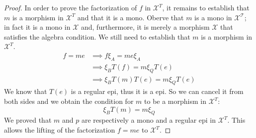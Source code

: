 \begin{subbox}{}
\begin{proof}
        In order to prove the factorization of $f$ in $\mathcal{X}^T$, it remains to establish that $m$ is a morphism in $\mathcal{X}^T$ and that it is a mono. Oberve that $m$ is a mono in $\mathcal{X^T}$; in fact it is a mono in $\mathcal{X}$ and, furthermore, it is merely a morphism $\mathcal{X}$ that satisfies the algebra condition. We still need to establish that $m$ is a morphism in $\mathcal{X}^T$.
        \begin{align*}
            f=me &\implies f \xi_A = me\xi_A \\[1.5ex]
            &\implies \xi_B T(f) = m \xi_Q T(e) \\[1.5ex]
            &\implies \xi_B T(m) T(e) =  m \xi_Q T(e)
        \end{align*}
        We know that $T(e)$ is a regular epi, thus it is a epi. So we can cancel it from both sides and we obtain the condition for $m$ to be a morphism in $\mathcal{X}^T$:
        \[ \xi_B T(m) =  m \xi_Q \]
        We proved that $m$ and $p$ are respectively a mono and a regular epi in $\mathcal{X}^T$. This allows the lifting of the factorization $f=me$ to $\mathcal{X}^T$.


\end{proof}
\end{subbox}
